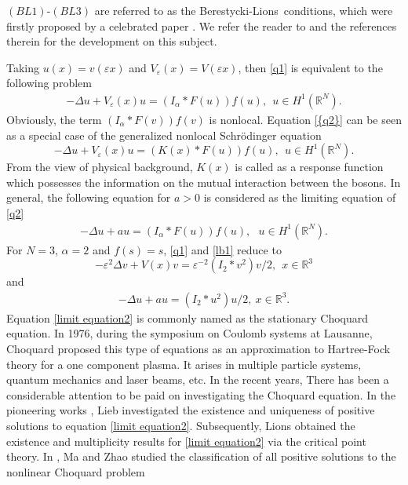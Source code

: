 \documentclass[12pt,reqno]{amsart}
\numberwithin{equation}{section}
\begin{document}
$(BL1)$-$(BL3)$ are referred to as the Berestycki-Lions\ conditions, which were
firstly proposed by a celebrated paper \cite{Lions}. We refer the reader to \cite{BT1,BT2,byeon4} and the references therein for the development on this subject.  \vskip0.1in

Taking $u(x)=v({\varepsilon} x)$ and $V_{\varepsilon}(x)=V({\varepsilon} x)$, then \eqref{q1} is
equivalent to the following problem
\begin{eqnarray}\label{q2}
-{\Delta} u+V_{\varepsilon}(x)u=(I_{\alpha}\ast F(u))f(u),\ \ u\in H^1({\mathbb R^N}).
\end{eqnarray}
Obviously, the term $(I_{\alpha}\ast F(v))f(v)$ is nonlocal. Equation {\eqref{{q2}}} can be seen as a special case of the generalized nonlocal
Schr\"odinger equation
\begin{equation}\label{q1r}
-{\Delta} u+V_{\varepsilon}(x)u=(K(x)\ast F(u))f(u),\ \ u\in H^1({\mathbb R^N}).
\end{equation}
From the view of physical background, $K(x)$ is called as a response function which possesses the information on the mutual interaction between the bosons. In general, the following equation for $a>0$ is considered as the limiting
equation of \eqref{q2}
\begin{eqnarray}\label{lb1}
-\Delta u+au=(I_{\alpha}\ast F(u))f(u),\ \ \ u\in H^1({\mathbb R^N}).
\end{eqnarray}
For $N=3$, ${\alpha}=2$ and $f(s)=s$, \eqref{q1} and \eqref{lb1} reduce to
\begin{equation}\label{main equation5}
-{\varepsilon}^2{\Delta} v+V(x)v={\varepsilon}^{-2}(I_2\ast v^2)v/2,\ \ x\in {\mathbb R}^3
\end{equation}
and
\begin{eqnarray}\label{limit equation2}
-\Delta u+au=(I_2\ast u^2)u/2, \ x\in {\mathbb R}^3.
\end{eqnarray}
Equation \eqref{limit equation2} is commonly named as the stationary
Choquard equation. In 1976, during the symposium on
Coulomb systems at Lausanne, Choquard proposed this type of equations as an approximation to Hartree-Fock
theory for a one component plasma\cite{LS}. It arises in multiple
particle systems\cite{Gross, LS}, quantum
mechanics\cite{Penrose1,Penrose2,Penrose3} and laser beams,
etc. In the recent years, There has been a considerable attention to be paid on investigating the Choquard equation. In the pioneering works \cite{Lieb1}, Lieb investigated the existence and uniqueness of positive solutions to equation \eqref{limit equation2}. Subsequently, Lions\cite{Lions2,Lions3} obtained the existence and multiplicity results for \eqref{limit equation2} via the critical point theory. In \cite{MZ}, Ma and Zhao studied the classification of all positive solutions to the nonlinear Choquard problem
\end{document}
